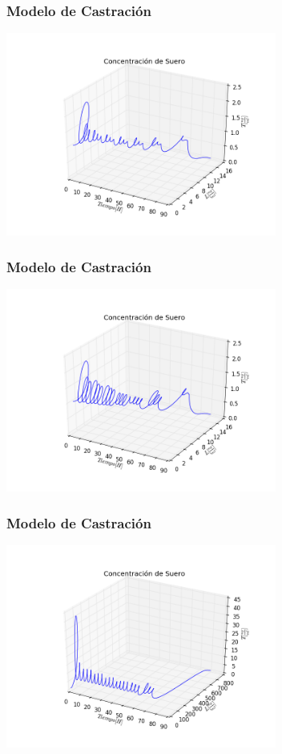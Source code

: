 \documentclass[10pt]{beamer}
\begin{document}
\begin{frame}
\frametitle{Modelo de Castración}
\begin{center}
 \includegraphics[width=3.5in]{imagenes/Graficas/Castracion/castracion_suero_primer_modelo_m_8.png}
\end{center}
\end{frame}

\begin{frame}
\frametitle{Modelo de Castración}
\begin{center}
 \includegraphics[width=3.5in]{imagenes/Graficas/Castracion/castracion_suero_primer_modelo_m_12.png}
\end{center}
\end{frame}

\begin{frame}
\frametitle{Modelo de Castración}
\begin{center}
 \includegraphics[width=3.5in]{imagenes/Graficas/Castracion/castracion_suero_segundo_modelo.png}
\end{center}
\end{frame}
\end{document}
